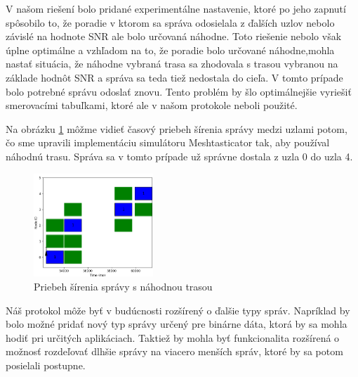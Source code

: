 \documentclass[slovak,master]{diploma}
\begin{document}
V našom riešení bolo pridané experimentálne nastavenie, ktoré po jeho zapnutí spôsobilo to, že poradie v ktorom sa správa odosielala z ďalších uzlov 
nebolo závislé na hodnote SNR ale bolo určovaná náhodne. Toto riešenie nebolo však úplne optimálne a vzhľadom na to, že poradie bolo určované 
náhodne,mohla nastať situácia, že náhodne vybraná trasa sa zhodovala s trasou vybranou 
na základe hodnôt SNR a správa sa teda tiež nedostala do cieľa. V tomto prípade bolo potrebné správu odoslať znovu. 
Tento problém by šlo optimálnejšie vyriešiť smerovacími tabuľkami, ktoré ale v našom protokole neboli použité.

Na obrázku \ref{fig:randomizePath} môžme vidieť časový priebeh šírenia správy medzi uzlami potom, čo sme upravili implementáciu simulátoru Meshtasticator tak, 
aby používal náhodnú trasu. Správa sa v tomto prípade už správne dostala z uzla 0 do uzla 4.

\begin{figure}[h!]
  \centering
  \includegraphics[width=0.4\textwidth]{Figures/randomizePath.png}
  \caption{Priebeh šírenia správy s náhodnou trasou}
  \label{fig:randomizePath}
\end{figure}

Náš protokol môže byť v budúcnosti rozšírený o ďalšie typy správ. Napríklad by bolo možné pridať nový typ správy určený pre binárne dáta, 
ktorá by sa mohla hodiť pri určitých aplikáciach. 
Taktiež by mohla byť funkcionalita rozšírená o možnosť rozdeľovať dlhšie správy na viacero menších správ, ktoré by sa potom posielali postupne.

\printbibliography[title={Literatura}, heading=bibintoc]
\end{document}
